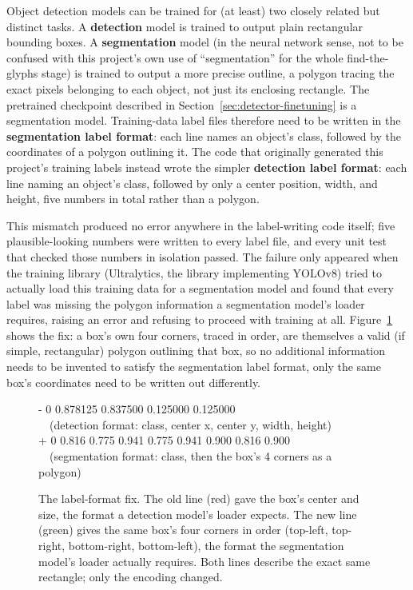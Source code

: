 \documentclass[11pt,a4paper]{report}
\begin{document}
Object detection models can be trained for (at least) two closely related
but distinct tasks. A \textbf{detection} model is trained to output plain
rectangular bounding boxes. A \textbf{segmentation} model (in the neural
network sense, not to be confused with this project's own use of
``segmentation'' for the whole find-the-glyphs stage) is trained to output
a more precise outline, a polygon tracing the exact pixels belonging to
each object, not just its enclosing rectangle. The pretrained checkpoint
described in Section~\ref{sec:detector-finetuning} is a segmentation model.
Training-data label files therefore need to be written in the
\textbf{segmentation label format}: each line names an object's class,
followed by the coordinates of a polygon outlining it. The code that
originally generated this project's training labels instead wrote the
simpler \textbf{detection label format}: each line naming an object's
class, followed by only a center position, width, and height, five numbers
in total rather than a polygon.

This mismatch produced no error anywhere in the label-writing code itself;
five plausible-looking numbers were written to every label file, and every
unit test that checked those numbers in isolation passed. The failure only
appeared when the training library (Ultralytics, the library implementing
YOLOv8) tried to actually load this training data for a segmentation model
and found that every label was missing the polygon information a
segmentation model's loader requires, raising an error and refusing to
proceed with training at all. Figure~\ref{fig:label-bug} shows the fix: a
box's own four corners, traced in order, are themselves a valid (if simple,
rectangular) polygon outlining that box, so no additional information needs
to be invented to satisfy the segmentation label format, only the same
box's coordinates need to be written out differently.

\begin{figure}[t]
\centering
\begin{tcolorbox}[
  colback=codebg, colframe=codeframe, boxrule=0.9pt,
  arc=2mm, left=8pt, right=8pt, top=6pt, bottom=6pt,
  fonttitle=\bfseries, title=Label line for one bounding box --- before / after,
  width=\linewidth
]
{\ttfamily\small
\noindent \textcolor{diffdel}{- 0 0.878125 0.837500 0.125000 0.125000}\\[3pt]
\textcolor{diffdel}{\ \ (detection format: class, center x, center y, width, height)}\\[8pt]
\textcolor{diffadd}{+ 0 0.816 0.775 0.941 0.775 0.941 0.900 0.816 0.900}\\[3pt]
\textcolor{diffadd}{\ \ (segmentation format: class, then the box's 4 corners as a polygon)}
}
\end{tcolorbox}
\caption{The label-format fix. The old line (red) gave the box's center and
size, the format a detection model's loader expects. The new line (green)
gives the same box's four corners in order (top-left, top-right,
bottom-right, bottom-left), the format the segmentation model's loader
actually requires. Both lines describe the exact same rectangle; only the
encoding changed.}
\label{fig:label-bug}
\end{figure}
\end{document}
